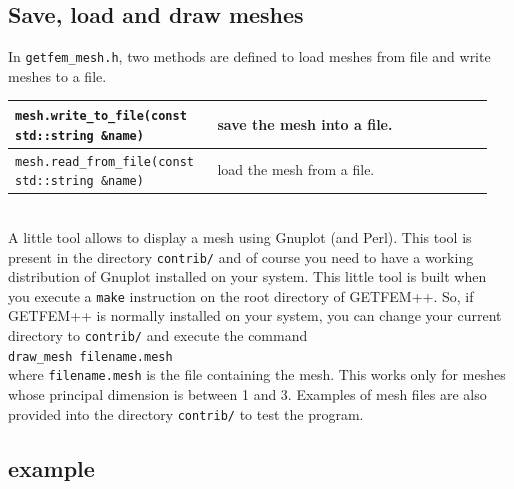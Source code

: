\documentclass[11pt,a4paper]{article}
\begin{document}
\subsection{Save, load and draw meshes}

In {\tt getfem\_mesh.h}, two methods are defined to load meshes from file and write meshes to a file. \\[0.5cm]
\begin{tabular}{|m{0.4\linewidth}|m{0.55\linewidth}|}\hline

  {\tt mesh.write\_to\_file(const std::string \&name)} & save the mesh into a file.\\ \hline

  {\tt mesh.read\_from\_file(const std::string \&name)} & load the mesh from a file.\\ \hline

\end{tabular} \\[0.5cm]

A little tool allows to display a mesh using Gnuplot (and Perl). This tool is present in the directory {\tt contrib/} and of course you need to have a working distribution of Gnuplot installed on your system. This little tool is built when you execute a {\tt make} instruction on the root directory of GETFEM++. So, if GETFEM++ is normally installed on your system, you can change your current directory to {\tt contrib/} and execute the command \\[0.5cm]
{\tt draw\_mesh filename.mesh} \\[0.5cm]
where {\tt filename.mesh} is the file containing the mesh. This works only for meshes whose principal dimension is between 1 and 3. Examples of mesh files are also provided into the directory {\tt contrib/} to test the program.

\subsection{example}
\end{document}
